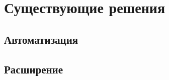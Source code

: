 \section{Существующие решения}

\subsection{Автоматизация}






\subsection{Расширение}








\pagebreak